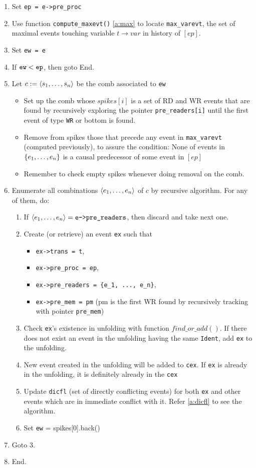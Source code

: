 \documentclass{llncs}
\begin{document}
\begin{enumerate}
\item Set \verb!ep = e->pre_proc!
\item
	Use function \verb!compute_maxevt()! \cref{a:max} to locate \verb!max_varevt!, the set of maximal events touching variable $t \rightarrow var$ in history of $[ep]$. 
\item Set \verb!ew = e!
\item If $\verb!ew! < \verb!ep!$, then goto End.
\item Let $c \mathrel{:=} \langle s_1, \ldots, s_n\rangle$ be the comb associated to \verb!ew!
	\begin{itemize}
	\item
		Set up the comb whose $spikes[i]$ is a set of RD and WR events that are found by recursively exploring the
		pointer \verb!pre_readers[i]! until the first event of type \verb!WR! or bottom is found.
	\item
		Remove from spikes those that precede any event in \verb!max_varevt! (computed previously), to assure the condition: None of events in ${\{ e_1, \ldots, e_n \mathclose \}} $ is a causal predecessor of some event in $[ep]$
	\item
		Remember to check empty spikes whenever doing removal on the comb.
\end{itemize}
\item
  Enumerate all combinations $\langle e_1, \ldots, e_n\rangle$ of $c$ by recursive algorithm.
  For any of them, do:
  \begin{enumerate}
  \item
    If $\tup{e_1, \ldots, e_n} = \verb!e->pre_readers!$, then discard and take
    next one.
  \item
    Create (or retrieve) an event \verb!ex! such that
    \begin{itemize}
    \item \verb!ex->trans = t!,
    \item \verb!ex->pre_proc = ep!,
    \item \verb!ex->pre_readers = {e_1, ..., e_n}!,
    \item \verb!ex->pre_mem = pm! (pm is the first WR found by recursively tracking with pointer \verb!pre_mem!)
    \end{itemize}
  \item
  	Check \verb!ex!'s existence in unfolding with function $find\_or\_add()$. If there does not exist an
  	event in the unfolding having the same \verb!Ident!, add \verb!ex! to the unfolding.
  \item
  	New event created in the unfolding will be added to \verb!cex!. If \verb!ex! is already in the
  	unfolding, it is definitely already in the \verb!cex!
  \item
  	Update \verb!dicfl! (set of directly conflicting events) for both \verb!ex! and other events which are in
  	immediate conflict with it. Refer \cref{a:dicfl} to see the algorithm.
  \item
    Set \verb!ew! = spikes[0].back() 
  \end{enumerate}
\item Goto 3.
\item End.
\end{enumerate}
\end{document}
